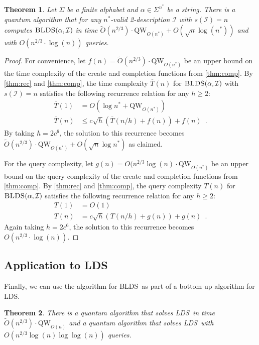 \documentclass[12pt]{article}
\newcommand{\qw}{\mathrm{QW}}
\newcommand{\Iset}{\mathcal{I}}
\newcommand{\blds}{\textsc{BLDS}}
\newcommand{\lds}{\textsc{LDS}}
\newtheorem{theorem}{Theorem}
\theoremstyle{definition}
\begin{document}
\begin{theorem}
\label{thm:qblds}
Let $\Sigma$ be a finite alphabet and $\alpha \in \Sigma^{n^*}$ be a string.  There is a quantum algorithm that for any $n^*$-valid 2-description $\Iset$ with $s(\Iset)=n$ computes $\blds(\alpha, \Iset)$ in time $\widetilde{O}(n^{2/3}) \cdot \qw_{O(n^*)} + O(\sqrt{n} \log(n^*))$ and with $O(n^{2/3} \cdot \log(n))$ queries.
\end{theorem}

\begin{proof}
For convenience, let $f(n) = \widetilde{O}(n^{2/3}) \cdot \qw_{O(n^*)}$ be an upper bound on the time complexity of the create and completion functions from \cref{thm:comp}.
By \cref{thm:rec} and \cref{thm:comp}, the time complexity $\overline{T}(n)$ for $\blds(\alpha, \Iset)$ with $s(\Iset)=n$ satisfies the following recurrence relation for any $h \ge 2$:
\begin{align*}
\overline{T}(1) &= O(\log n^* + \qw_{O(n^*)}) \\
\overline{T}(n) &\le c \sqrt{h}(\overline{T}(n/h) + f(n)) + f(n) \enspace. 
\end{align*}
By taking $h = 2c^6$, the solution to this recurrence becomes $\widetilde{O}(n^{2/3}) \cdot \qw_{O(n^*)} + O(\sqrt{n} \log n^*)$
as claimed.

For the query complexity, let $g(n) = O(n^{2/3} \log(n) \cdot \qw_{O(n^*)}$ be an upper bound on the query complexity of the create and completion functions from \cref{thm:comp}.
By \cref{thm:rec} and \cref{thm:comp}, the query complexity $T(n)$ for $\blds(\alpha, \Iset)$ satisfies the following recurrence relation for any $h \ge 2$:
\begin{align*}
T(1) &= O(1) \\
T(n) &= c \sqrt{h}(T(n/h) + g(n)) + g(n) \enspace.
\end{align*}
Again taking $h = 2c^6$, the solution to this recurrence becomes 
$O(n^{2/3} \cdot \log(n))$.
\end{proof}

\subsection{Application to \lds}
Finally, we can use the algorithm for \blds\ as part of a bottom-up algorithm for \lds.
\begin{theorem} \label{thm:lds}
There is a quantum algorithm that solves \lds\ in time $\widetilde O(n^{2/3}) \cdot \qw_{O(n)}$ and a quantum algorithm that solves \lds\ with $O(n^{2/3} \log(n) \log \log(n))$ queries.
\end{theorem}
\end{document}
